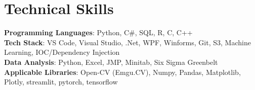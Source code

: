 \documentclass[letterpaper,11pt]{article}
\begin{document}
%
\section{Technical Skills}
 \begin{itemize}[leftmargin=0.15in, label={}]
    \small{\item{
     \textbf{Programming Languages}{: Python, C\#, SQL, R, C, C++} \\
     \textbf{Tech Stack}{: VS Code, Visual Studio, .Net, WPF, Winforms, Git, S3, Machine Learning, IOC/Dependency Injection} \\
     \textbf{Data Analysis}{: Python, Excel, JMP, Minitab, Six Sigma Greenbelt} \\
     \textbf{Applicable Libraries}{: Open-CV (Emgu.CV), Numpy, Pandas, Matplotlib, Plotly, streamlit, pytorch, tensorflow} \\
    }}
 \end{itemize}
 \vspace{-16pt}
\end{document}
